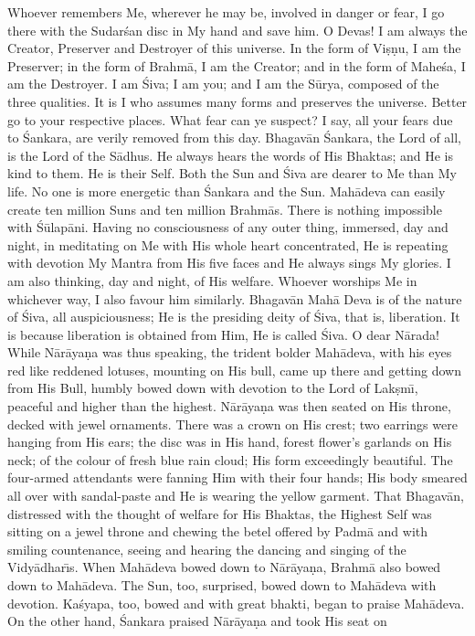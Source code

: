 Whoever remembers Me, wherever he may be, involved in danger or fear, I go there with the Sudar\'san disc in My hand and save him. O Devas! I am always the Creator, Preserver and Destroyer of this universe. In the form of Vi\d{s}\d{n}u, I am the Preserver; in the form of Brahm\=a, I am the Creator; and in the form of Mahe\'sa, I am the Destroyer. I am \'Siva; I am you; and I am the S\=urya, composed of the three qualities. It is I who assumes many forms and preserves the universe. Better go to your respective places. What fear can ye suspect? I say, all your fears due to \'Sankara, are verily removed from this day. Bhagav\=an \'Sankara, the Lord of all, is the Lord of the S\=adhus. He always hears the words of His Bhaktas; and He is kind to them. He is their Self. Both the Sun and \'Siva are dearer to Me than My life. No one is more energetic than \'Sankara and the Sun. Mah\=adeva can easily create ten million Suns and ten million Brahm\=as. There is nothing impossible with \'S\=ulap\=ani. Having no consciousness of any outer thing, immersed, day and night, in meditating on Me with His whole heart concentrated, He is repeating with devotion My Mantra from His five faces and He always sings My glories. I am also thinking, day and night, of His welfare. Whoever worships Me in whichever way, I also favour him similarly. Bhagav\=an Mah\=a Deva is of the nature of \'Siva, all auspiciousness; He is the presiding deity of \'Siva, that is, liberation. It is because liberation is obtained from Him, He is called \'Siva. O dear N\=arada! While N\=ar\=aya\d{n}a was thus speaking, the trident bolder Mah\=adeva, with his eyes red like reddened lotuses, mounting on His bull, came up there and getting down from His Bull, humbly bowed down with devotion to the Lord of Lak\d{s}m\={\i}, peaceful and higher than the highest. N\=ar\=aya\d{n}a was then seated on His throne, decked with jewel ornaments. There was a crown on His crest; two earrings were hanging from His ears; the disc was in His hand, forest flower's garlands on His neck; of the colour of fresh blue rain cloud; His form exceedingly beautiful. The four-armed attendants were fanning Him with their four hands; His body smeared all over with sandal-paste and He is wearing the yellow garment. That Bhagav\=an, distressed with the thought of welfare for His Bhaktas, the Highest Self was sitting on a jewel throne and chewing the betel offered by Padm\=a and with smiling countenance, seeing and hearing the dancing and singing of the Vidy\=adhar\={\i}s. When Mah\=adeva bowed down to N\=ar\=aya\d{n}a, Brahm\=a also bowed down to Mah\=adeva. The Sun, too, surprised, bowed down to Mah\=adeva with devotion. Ka\'syapa, too, bowed and with great bhakti, began to praise Mah\=adeva. On the other hand, \'Sankara praised N\=ar\=aya\d{n}a and took His seat on

